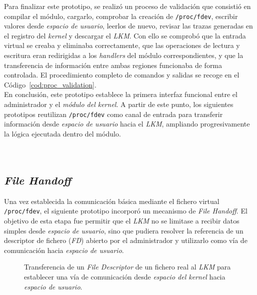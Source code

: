 Para finalizar este prototipo, se realizó un proceso de validación que consistió en compilar el módulo, cargarlo, comprobar la creación de \texttt{/proc/fdev}, escribir valores desde \textit{espacio de usuario}, leerlos de nuevo, revisar las trazas generadas en el registro del \textit{kernel} y descargar el \textit{LKM}.
Con ello se comprobó que la entrada virtual se creaba y eliminaba correctamente, que las operaciones de lectura y escritura eran redirigidas a los \textit{handlers} del módulo correspondientes, y que la transferencia de información entre ambas regiones funcionaba de forma controlada.
El procedimiento completo de comandos y salidas se recoge en el Código~\ref{cod:proc_validation}.\\

En conclusión, este prototipo establece la primera interfaz funcional entre el administrador y el \textit{módulo del kernel}.
A partir de este punto, los siguientes prototipos reutilizan \texttt{/proc/fdev} como canal de entrada para transferir información desde \textit{espacio de usuario} hacia el \textit{LKM}, ampliando progresivamente la lógica ejecutada dentro del módulo.\\\\

\

\subsection{\textit{File Handoff}}
\label{sec:file_handoff}

Una vez establecida la comunicación básica mediante el fichero virtual \texttt{/proc/fdev}, el siguiente prototipo incorporó un mecanismo de \textit{File Handoff}.
El objetivo de esta etapa fue permitir que el \textit{LKM} no se limitase a recibir datos simples desde \textit{espacio de usuario}, sino que pudiera resolver la referencia de un descriptor de fichero (\textit{FD}) abierto por el administrador y utilizarlo como vía de comunicación hacia \textit{espacio de usuario}.\\

\begin{figure}[h!]
  \centering
  \scalebox{0.95}{}
  \caption{Transferencia de un \textit{File Descriptor} de un fichero real al \textit{LKM} para establecer una vía de comunicación desde \textit{espacio del kernel} hacia \textit{espacio de usuario}.}
  \label{fig:file_handoff_scheme}
\end{figure}

